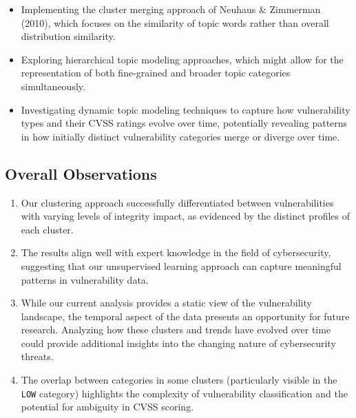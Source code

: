 \documentclass[12pt]{article}
\begin{document}
\begin{itemize}

	\item Implementing the cluster merging approach of Neuhaus \& Zimmerman (2010), which focuses on
	      the similarity of topic words rather than overall distribution similarity.

	\item Exploring hierarchical topic modeling approaches, which might allow for the representation
	      of both fine-grained and broader topic categories simultaneously.

	\item Investigating dynamic topic modeling techniques to capture how vulnerability types and
	      their CVSS ratings evolve over time, potentially revealing patterns in how initially
	      distinct vulnerability categories merge or diverge over time.

\end{itemize}


\subsection{Overall Observations}

\begin{enumerate}

	\item Our clustering approach successfully differentiated between vulnerabilities with varying
	      levels of integrity impact, as evidenced by the distinct profiles of each cluster.

	\item The results align well with expert knowledge in the field of cybersecurity, suggesting
	      that our unsupervised learning approach can capture meaningful patterns in vulnerability
	      data.

	\item While our current analysis provides a static view of the vulnerability landscape, the
	      temporal aspect of the data presents an opportunity for future research. Analyzing how these
	      clusters and trends have evolved over time could provide additional insights into the
	      changing nature of cybersecurity threats.

	\item The overlap between categories in some clusters (particularly visible in the \texttt{LOW}
	      category) highlights the complexity of vulnerability classification and the potential for
	      ambiguity in CVSS scoring.

\end{enumerate}
\end{document}
